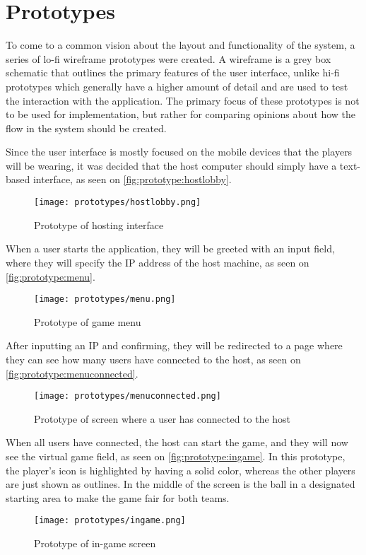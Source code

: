 \section{Prototypes}
To come to a common vision about the layout and functionality of the system, a series of lo-fi wireframe prototypes were created.
A wireframe is a grey box schematic that outlines the primary features of the user interface, unlike hi-fi prototypes which generally have a higher amount of detail and are used to test the interaction with the application.
The primary focus of these prototypes is not to be used for implementation, but rather for comparing opinions about how the flow in the system should be created.

Since the user interface is mostly focused on the mobile devices that the players will be wearing, it was decided that the host computer should simply have a text-based interface, as seen on \autoref{fig:prototype:hostlobby}.

\begin{figure}[H]
    \centering
    \texttt{[image: prototypes/hostlobby.png]}
    \caption{Prototype of hosting interface}
    \label{fig:prototype:hostlobby}
\end{figure}

When a user starts the application, they will be greeted with an input field, where they will specify the IP address of the host machine, as seen on \autoref{fig:prototype:menu}. 

\begin{figure}[H]
    \centering
    \texttt{[image: prototypes/menu.png]}
    \caption{Prototype of game menu}
    \label{fig:prototype:menu}
\end{figure}

After inputting an IP and confirming, they will be redirected to a page where they can see how many users have connected to the host, as seen on \autoref{fig:prototype:menuconnected}. 

\begin{figure}[H]
    \centering
    \texttt{[image: prototypes/menuconnected.png]}
    \caption{Prototype of screen where a user has connected to the host}
    \label{fig:prototype:menuconnected}
\end{figure}

When all users have connected, the host can start the game, and they will now see the virtual game field, as seen on \autoref{fig:prototype:ingame}.
In this prototype, the player's icon is highlighted by having a solid color, whereas the other players are just shown as outlines.
In the middle of the screen is the ball in a designated starting area to make the game fair for both teams.

\begin{figure}[H]
    \centering
    \texttt{[image: prototypes/ingame.png]}
    \caption{Prototype of in-game screen}
    \label{fig:prototype:ingame}
\end{figure}
